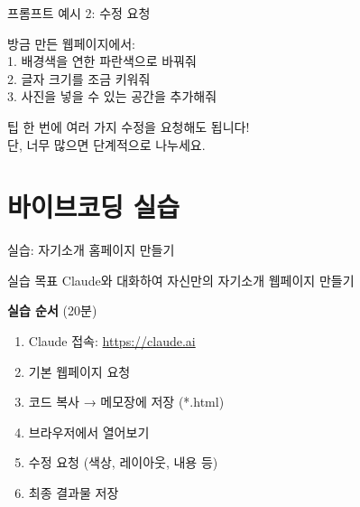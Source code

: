 \documentclass[aspectratio=169]{beamer}
\begin{document}
\begin{frame}[fragile]{프롬프트 예시 2: 수정 요청}
  \begin{tcolorbox}[title=수정 프롬프트]
    \small\ttfamily
    방금 만든 웹페이지에서:\\[0.3em]
    1. 배경색을 연한 파란색으로 바꿔줘\\
    2. 글자 크기를 조금 키워줘\\
    3. 사진을 넣을 수 있는 공간을 추가해줘
  \end{tcolorbox}
  
  \vspace{0.5em}
  
  \begin{alertblock}{팁}
    한 번에 여러 가지 수정을 요청해도 됩니다!\\
    단, 너무 많으면 단계적으로 나누세요.
  \end{alertblock}
\end{frame}

\section{바이브코딩 실습}

\begin{frame}{실습: 자기소개 홈페이지 만들기}
  \begin{block}{실습 목표}
    Claude와 대화하여 자신만의 자기소개 웹페이지 만들기
  \end{block}
  
  \vspace{0.5em}
  
  \textbf{실습 순서} (20분)
  \begin{enumerate}
    \item Claude 접속: \url{https://claude.ai}
    \item 기본 웹페이지 요청
    \item 코드 복사 → 메모장에 저장 (*.html)
    \item 브라우저에서 열어보기
    \item 수정 요청 (색상, 레이아웃, 내용 등)
    \item 최종 결과물 저장
  \end{enumerate}
\end{frame}
\end{document}
